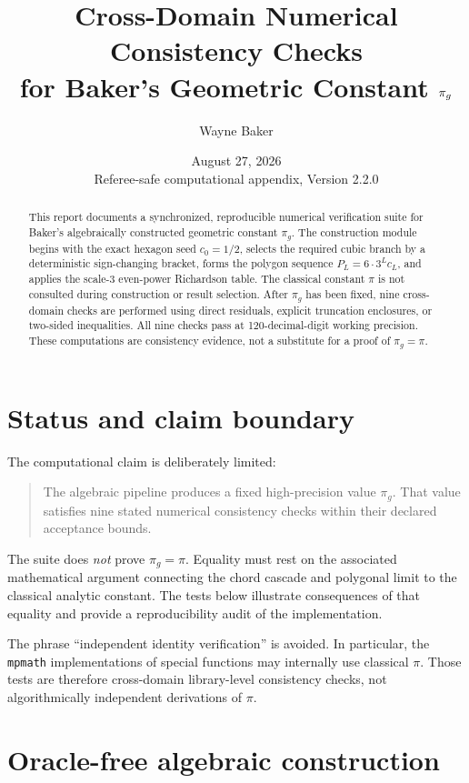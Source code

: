 \documentclass[11pt]{article}
\title{Cross-Domain Numerical Consistency Checks\\for Baker's Geometric Constant $\pig$}
\author{Wayne Baker}
\date{August 27, 2026\\Referee-safe computational appendix, Version 2.2.0}
\newcommand{\pig}{\pi_g}
\begin{document}
\maketitle

\begin{abstract}
This report documents a synchronized, reproducible numerical verification suite for Baker's algebraically constructed geometric constant $\pig$.  The construction module begins with the exact hexagon seed $c_0=1/2$, selects the required cubic branch by a deterministic sign-changing bracket, forms the polygon sequence $P_L=6\cdot3^L c_L$, and applies the scale-$3$ even-power Richardson table.  The classical constant $\pi$ is not consulted during construction or result selection.  After $\pig$ has been fixed, nine cross-domain checks are performed using direct residuals, explicit truncation enclosures, or two-sided inequalities.  All nine checks pass at 120-decimal-digit working precision.  These computations are consistency evidence, not a substitute for a proof of $\pig=\pi$.
\end{abstract}

\tableofcontents
\newpage

\section{Status and claim boundary}

The computational claim is deliberately limited:

\begin{quote}
The algebraic pipeline produces a fixed high-precision value $\pig$.  That value satisfies nine stated numerical consistency checks within their declared acceptance bounds.
\end{quote}

The suite does \emph{not} prove $\pig=\pi$.  Equality must rest on the associated mathematical argument connecting the chord cascade and polygonal limit to the classical analytic constant.  The tests below illustrate consequences of that equality and provide a reproducibility audit of the implementation.

The phrase ``independent identity verification'' is avoided.  In particular, the \texttt{mpmath} implementations of special functions may internally use classical $\pi$.  Those tests are therefore cross-domain library-level consistency checks, not algorithmically independent derivations of $\pi$.

\section{Oracle-free algebraic construction}
\end{document}
